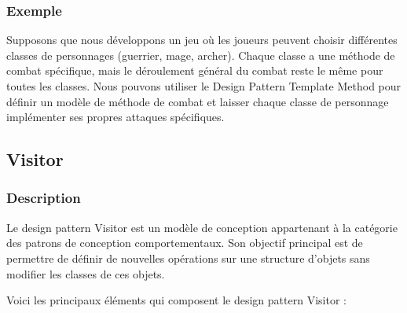 \documentclass[french]{article}
\begin{document}
\subsubsection{Exemple}

Supposons que nous développons un jeu où les joueurs peuvent choisir différentes classes de personnages (guerrier, mage, archer). Chaque classe a une méthode de combat spécifique, mais le déroulement général du combat reste le même pour toutes les classes. Nous pouvons utiliser le Design Pattern Template Method pour définir un modèle de méthode de combat et laisser chaque classe de personnage implémenter ses propres attaques spécifiques.





\newpage

\subsection{Visitor}

\subsubsection{Description}

Le design pattern Visitor est un modèle de conception appartenant à la catégorie des patrons de conception comportementaux. Son objectif principal est de permettre de définir de nouvelles opérations sur une structure d'objets sans modifier les classes de ces objets.

Voici les principaux éléments qui composent le design pattern Visitor :
\end{document}
